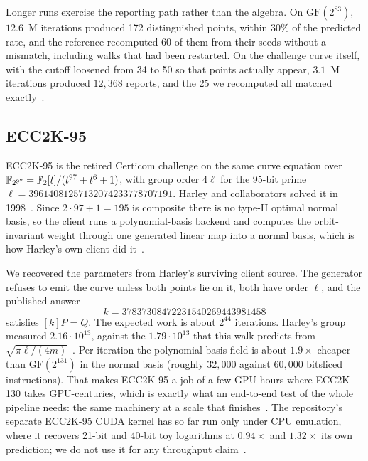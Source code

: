 Longer runs exercise the reporting path rather than the algebra. On
$\mathrm{GF}(2^{83})$, $12.6$~M iterations produced 172 distinguished
points, within $30\%$ of the predicted rate, and the reference
recomputed 60 of them from their seeds without a mismatch, including
walks that had been restarted. On the challenge curve itself, with the
cutoff loosened from 34 to 50 so that points actually appear, $3.1$~M
iterations produced $12{,}368$ reports, and the 25 we recomputed all
matched exactly~.

\subsection{ECC2K-95}
\label{sec:ecc2k95}

ECC2K-95 is the retired Certicom challenge on the same curve equation
over $\mathbb{F}_{2^{97}} = \mathbb{F}_2[t]/(t^{97}+t^6+1)$, with group order $4\ell$
for the 95-bit prime $\ell = 39614081257132074233778707191$. Harley and
collaborators solved it in 1998~\cite{harley1998}. Since $2\cdot97+1=195$
is composite there is no type-II optimal normal basis, so the client
runs a polynomial-basis backend and computes the orbit-invariant
weight through one generated linear map into a normal basis, which is
how Harley's own client did it~.

We recovered the parameters from Harley's surviving client source.
The generator refuses to emit the curve unless both points lie on it,
both have order $\ell$, and the published answer
\[
  k = 37837308472231540269443981458
\]
satisfies $[k]P=Q$. The expected work is about $2^{44}$ iterations.
Harley's group measured $2.16\cdot10^{13}$, against the
$1.79\cdot10^{13}$ that this walk predicts from
$\sqrt{\pi\ell/(4m)}$~. Per
iteration the polynomial-basis field is about $1.9\times$ cheaper than
$\mathrm{GF}(2^{131})$ in the normal basis (roughly $32{,}000$ against
$60{,}000$ bitsliced instructions). That makes ECC2K-95 a job of a few
GPU-hours where ECC2K-130 takes GPU-centuries, which is exactly what an
end-to-end test of the whole pipeline needs: the same machinery at a
scale that finishes~. The
repository's separate ECC2K-95 CUDA kernel has so far run only under
CPU emulation, where it recovers 21-bit and 40-bit toy logarithms at
$0.94\times$ and $1.32\times$ its own prediction; we do not use it for
any throughput claim~.

